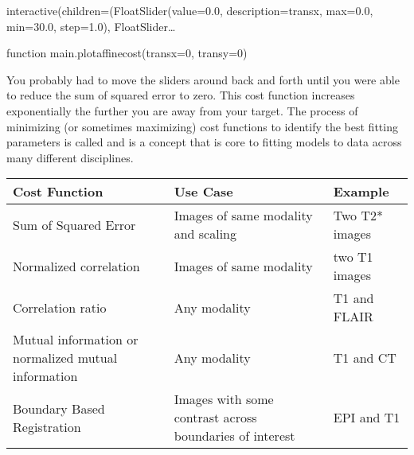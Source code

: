 \documentclass[letterpaper,10pt,english]{sphinxmanual}
\begin{document}
\begin{sphinxVerbatim}[commandchars=\\\{\}]
            
            
\end{sphinxVerbatim}

\begin{sphinxVerbatim}[commandchars=\\\{\}]
interactive(children=(FloatSlider(value=0.0, description=\PYGZsq{}trans\PYGZus{}x\PYGZsq{}, max=0.0, min=\PYGZhy{}30.0, step=1.0), FloatSlider…
\end{sphinxVerbatim}

\begin{sphinxVerbatim}[commandchars=\\\{\}]
\PYGZlt{}function \PYGZus{}\PYGZus{}main\PYGZus{}\PYGZus{}.plot\PYGZus{}affine\PYGZus{}cost(trans\PYGZus{}x=0, trans\PYGZus{}y=0)\PYGZgt{}
\end{sphinxVerbatim}


You probably had to move the sliders around back and forth until you were able to reduce the sum of squared error to zero. This cost function increases exponentially the further you are away from your target. The process of minimizing (or sometimes maximizing) cost functions to identify the best fitting parameters is called  and is a concept that is core to fitting models to data across many different disciplines.


\begin{savenotes}\sphinxattablestart
\centering
\begin{tabulary}{\linewidth}[t]{|T|T|T|}
\hline
\sphinxstyletheadfamily 
Cost Function
&\sphinxstyletheadfamily 
Use Case
&\sphinxstyletheadfamily 
Example
\\
\hline
Sum of Squared Error
&
Images of same modality and scaling
&
Two T2* images
\\
\hline
Normalized correlation
&
Images of same modality
&
two T1 images
\\
\hline
Correlation ratio
&
Any modality
&
T1 and FLAIR
\\
\hline
Mutual information or normalized mutual information
&
Any modality
&
T1 and CT
\\
\hline
Boundary Based Registration
&
Images with some contrast across boundaries of interest
&
EPI and T1
\\
\hline
\end{tabulary}
\par
\sphinxattableend\end{savenotes}
\end{document}
